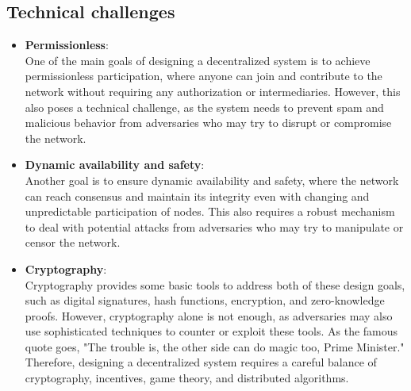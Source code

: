 \subsection*{Technical challenges}
\begin{itemize}
	\item \textbf{Permissionless}:\\
	One of the main goals of designing a decentralized system is to achieve permissionless participation, where anyone can join and contribute to the network without requiring any authorization or intermediaries. However, this also poses a technical challenge, as the system needs to prevent spam and malicious behavior from adversaries who may try to disrupt or compromise the network.
	\item \textbf{Dynamic availability and safety}:\\
	Another goal is to ensure dynamic availability and safety, where the network can reach consensus and maintain its integrity even with changing and unpredictable participation of nodes. This also requires a robust mechanism to deal with potential attacks from adversaries who may try to manipulate or censor the network.
	\item \textbf{Cryptography}:\\
	Cryptography provides some basic tools to address both of these design goals, such as digital signatures, hash functions, encryption, and zero-knowledge proofs. However, cryptography alone is not enough, as adversaries may also use sophisticated techniques to counter or exploit these tools. As the famous quote goes, "The trouble is, the other side can do magic too, Prime Minister." Therefore, designing a decentralized system requires a careful balance of cryptography, incentives, game theory, and distributed algorithms.
\end{itemize}

